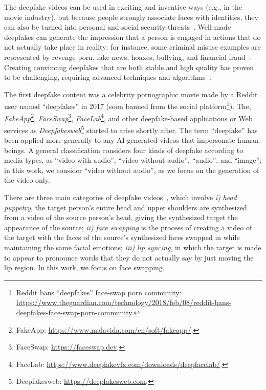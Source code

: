 \documentclass[preprint]{elsarticle}
\begin{document}
The deepfake videos can be used in exciting and inventive ways (e.g., in the movie industry), but because people strongly associate faces with  identities, they can also be turned into personal and social security-threats~\cite{securitythreat}. Well-made deepfakes  can generate the impression that a person is  engaged in actions that do not actually take place in reality: for instance, some criminal misuse examples are represented by revenge porn, fake news, hoaxes, bullying, and financial fraud~\cite{financialfraud}.
Creating convincing deepfakes that are both stable and high quality has proven  to be challenging, requiring advanced techniques and algorithms~\cite{survey2}. 

The first deepfake content was a celebrity pornographic movie made by a Reddit user named ``deepfakes'' in 2017 (soon banned from the social platform\footnote{Reddit bans ``deepfakes'' face-swap porn community: \url{https://www.theguardian.com/technology/2018/feb/08/reddit-bans-deepfakes-face-swap-porn-community}.}). The, \emph{FakeApp}\footnote{FakeApp: \url{https://www.malavida.com/en/soft/fakeapp/}.}, \emph{FaceSwap}\footnote{FaceSwap: \url{https://faceswap.dev}.}, \emph{FaceLab}\footnote{FaceLab: \url{https://www.deepfakevfx.com/downloads/deepfacelab/}.}, and other deepfake-based applications or Web services as \emph{Deepfakesweb}\footnote{Deepfakesweb: \url{https://deepfakesweb.com}.} started to arise shortly after. 
The term ``deepfake'' has been applied more generally to any AI-generated videos that impersonate human beings.
A general classification considers  four kinds of deepfake according to media types\cite{surveydet}, as ``video with audio'', ``video without audio'', ``audio'', and ``image''; in this work, we consider ``video without audio'', as we focus on the generation of the video only.

There are three main categories of deepfake videos~\cite{lyu}, which involve \emph{i)} \emph{head puppetry}, the target person's entire head and upper shoulders are synthesized from a video of the source person's head, giving the synthesized target the appearance of the source; \emph{ii)} \emph{face swapping} is the process of creating a video of the target with the faces of the source's synthesized faces swapped in while maintaining the same facial emotions; \emph{iii)} \emph{lip syncing}, in which the target is made to appear to pronounce words that they do not actually say by just moving the lip region. In this work, we focus on face swapping.
\end{document}
